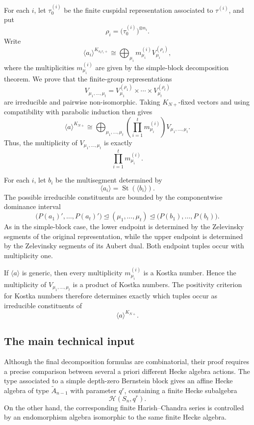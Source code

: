 \documentclass[12pt]{article}
\theoremstyle{remark}
\begin{document}
For each \(i\), let \(\tau_0^{(i)}\) be the finite cuspidal
representation associated to \(\tau^{(i)}\), and put
$$
\rho_i=
\bigl(\tau_0^{(i)}\bigr)^{\otimes n_i}.
$$
Write
$$
\langle a_i\rangle^{K_{n_ir_i+}}
\cong
\bigoplus_{\mu_i}
m^{(i)}_{\mu_i}V^{(\rho_i)}_{\mu_i},
$$
where the multiplicities \(m^{(i)}_{\mu_i}\) are given by the
simple-block decomposition theorem. We prove that the
finite-group representations
$$
V_{\mu_1,\ldots,\mu_t}
=
V^{(\rho_1)}_{\mu_1}
\times\cdots\times
V^{(\rho_t)}_{\mu_t}
$$
are irreducible and pairwise non-isomorphic. Taking
\(K_{N+}\)-fixed vectors and using compatibility with parabolic
induction then gives
$$
\langle a\rangle^{K_{N+}}
\cong
\bigoplus_{\mu_1,\ldots,\mu_t}
\left(
\prod_{i=1}^{t}m^{(i)}_{\mu_i}
\right)
V_{\mu_1,\ldots,\mu_t}.
$$
Thus, the multiplicity of
\(V_{\mu_1,\ldots,\mu_t}\) is exactly
$$
\prod_{i=1}^{t}m^{(i)}_{\mu_i}.
$$

For each \(i\), let \(b_i\) be the multisegment determined by
$$
\langle a_i\rangle
=
\operatorname{St}(\langle b_i\rangle).
$$
The possible irreducible constituents are bounded by the
componentwise dominance interval
$$
\bigl(P(a_1)',\ldots,P(a_t)'\bigr)
\unlhd
(\mu_1,\ldots,\mu_t)
\unlhd
\bigl(P(b_1),\ldots,P(b_t)\bigr).
$$
As in the simple-block case, the lower endpoint is determined by
the Zelevinsky segments of the original representation, while
the upper endpoint is determined by the Zelevinsky segments of
its Aubert dual. Both endpoint tuples occur with multiplicity
one.

If \(\langle a\rangle\) is generic, then every multiplicity
\(m^{(i)}_{\mu_i}\) is a Kostka number. Hence the multiplicity
of \(V_{\mu_1,\ldots,\mu_t}\) is a product of Kostka numbers.
The positivity criterion for Kostka numbers therefore determines
exactly which tuples occur as irreducible constituents of
$$
\langle a\rangle^{K_{N+}}.
$$

\subsection*{The main technical input}

Although the final decomposition formulas are combinatorial,
their proof requires a precise comparison between several
a priori different Hecke algebra actions. The type associated
to a simple depth-zero Bernstein block gives an affine Hecke
algebra of type \(\widetilde A_{n-1}\) with parameter \(q^r\),
containing a finite Hecke subalgebra
$$
\mathcal{H}(S_n,q^r).
$$
On the other hand, the corresponding finite Harish--Chandra
series is controlled by an endomorphism algebra isomorphic to
the same finite Hecke algebra.
\end{document}
